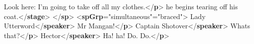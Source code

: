 \begin{shaded}
Look here: I'm going to take off all my clothes.{</\textbf{p}>}\mbox{}\newline 
{}he begins tearing off his coat.{</\textbf{stage}>}\mbox{}\newline 
{</\textbf{sp}>}\mbox{}\newline 
{<\textbf{spGrp}\hspace*{1em}{type}="{simultaneous}"\hspace*{1em}{rend}="{braced}">}\mbox{}\newline 
{}\mbox{}\newline 
\hspace*{1em}Lady Utterword{</\textbf{speaker}>}\mbox{}\newline 
\hspace*{1em}Mr Mangan!{</\textbf{p}>}\mbox{}\newline 
{}\mbox{}\newline 
{}\mbox{}\newline 
\hspace*{1em}Captain Shotover{</\textbf{speaker}>}\mbox{}\newline 
\hspace*{1em}Whats that?{</\textbf{p}>}\mbox{}\newline 
{}\mbox{}\newline 
{}\mbox{}\newline 
\hspace*{1em}Hector{</\textbf{speaker}>}\mbox{}\newline 
\hspace*{1em}Ha! ha! Do. Do.{</\textbf{p}>}\mbox{}\newline 

\end{shaded}
